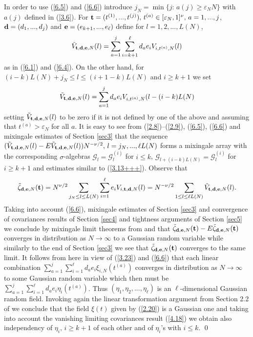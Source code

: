   In order to use (\ref{6.5}) and (\ref{6.6}) introduce 
  $j_N=\min\{ j:\, a(j)\geq{{\varepsilon}}_NN\}$ with $a(j)$ defined in (\ref{3.6}).
  For ${{\bf t}}=(t^{(1)},...,t^{(j)}),\, t^{(a)}\in[{{\varepsilon}}_N,1]^\nu,\, a=1,...,j$,
  ${{\bf d}}=(d_1,...,d_j)$ and ${{\bf e}}=(e_{k+1},...,e_\ell)$ define for $l=1,2,...,
  L(N)$,
  \begin{equation}\label{6.7}
  \tilde V_{{{\bf t}},{{\bf d}},{{\bf e}},N}(l)=\sum_{a=1}^j\sum_{i=k+1}^\ell 
  d_ae_iV_{i,t^{(a)},N}(l)
  \end{equation}
  as in (\ref{6.1}) and (\ref{6.4}). On the other hand, for $(i-k)L(N)+j_N
  \leq l\leq (i+1-k)L(N)$ and $i\geq k+1$ we set
  \begin{equation}\label{6.8}
  \tilde V_{{{\bf t}},{{\bf d}},{{\bf e}},N}(l)=\sum_{a=1}^j d_ae_iV_{i,t^{(a)},N}
  (l-(i-k)L(N)
  \end{equation}
  setting $\tilde V_{{{\bf t}},{{\bf d}},{{\bf e}},N}(l)$ to be zero if it is not defined 
  by one of the above and assuming that $t^{(a)}>{{\varepsilon}}_N$ for all $a$. 
  It is easy to see from (\ref{2.8})--(\ref{2.9}), (\ref{6.5}), (\ref{6.6})
  and mixingale estimates of Section \ref{sec3} that the sequence  
  $(\tilde V_{{{\bf t}},{{\bf d}},{{\bf e}},N}(l)-E\tilde V_{{{\bf t}},{{\bf d}},{{\bf e}},N}(l))N^{-\nu/2},\,
  l=j_N,...,\ell L(N)$ forms a mixingale 
  array with the corresponding ${{\sigma}}$-algebras ${{\mathcal G}}_l={{\mathcal G}}_l^{(i)}$ for 
  $i\leq k$, ${{\mathcal G}}_{l+(i-k)L(N)}={{\mathcal G}}_l^{(i)}$ for $i\geq k+1$ and estimates
  similar to (\ref{3.13+++}). Observe that
  \[
  \tilde\zeta_{{{\bf d}},{{\bf e}},N}({{\bf t}})=N^{\nu/2}\sum_{j_N\leq l\leq L(N)}
  \sum_{i=1}^\ell e_iV_{i,{{\bf t}},
  {{\bf d}},N}(l)=N^{-\nu/2}\sum_{1\leq l\leq\ell L(N)}\tilde V_{{{\bf t}},{{\bf d}},{{\bf e}},N}(l).
  \]
  Taking into account (\ref{6.6}), mixingale estimates of Section \ref{sec3}
  and convergence of covariances results of Section \ref{sec4}
  and tightness arguments of Section \ref{sec5}
  we conclude by mixingale limit theorems from \cite{ML2} and \cite{Jo} that
  $\tilde\zeta_{{{\bf d}},{{\bf e}},N}({{\bf t}})-E\tilde\zeta_{{{\bf d}},{{\bf e}},N}({{\bf t}})$ converges
  in distribution as $N\to\infty$ to a Gaussian random variable while similarly
  to the end of Section \ref{sec3} we see that 
  $\tilde\zeta_{{{\bf d}},{{\bf e}},N}({{\bf t}})$ converges to the same limit.
  It follows from here in view of (\ref{3.23}) and (\ref{6.6})
  that each linear combination $\sum_{a=1}^j\sum_{i=1}^\ell 
  d_ae_i\xi_{i,N}(t^{(a)})$ converges in distribution as $N\to\infty$ to 
  some Gaussian random variable which then must be $\sum_{a=1}^j\sum_{i=1}^\ell 
  d_ae_i\eta_i(t^{(a)})$. Thus $(\eta_1,\eta_2,...,\eta_\ell)$ is an
  $\ell$-dimensional Gaussian random field. Invoking again the linear 
  transformation argument from Section 2.2 of \cite{Bog} we conclude 
   that the field $\xi(t)$ given by (\ref{2.20}) is a Gaussian one
  and taking into account the vanishing limiting covariances result
  (\ref{4.18}) we obtain also independency of $\eta_i,\, i\geq k+1$ of
  each other and of $\eta_i$'s with $i\leq k$.
  \qed
  
